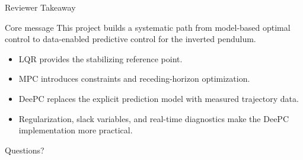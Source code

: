 \documentclass[aspectratio=169,11pt]{beamer}
\begin{document}
\begin{frame}{Reviewer Takeaway}
    \begin{block}{Core message}
        This project builds a systematic path from model-based optimal control to data-enabled predictive control for the inverted pendulum.
    \end{block}

    \vspace{0.4cm}
    \begin{itemize}
        \item LQR provides the stabilizing reference point.
        \item MPC introduces constraints and receding-horizon optimization.
        \item DeePC replaces the explicit prediction model with measured trajectory data.
        \item Regularization, slack variables, and real-time diagnostics make the DeePC implementation more practical.
    \end{itemize}
\end{frame}

\begin{frame}
    \centering
    \Huge Questions?
\end{frame}
\end{document}
